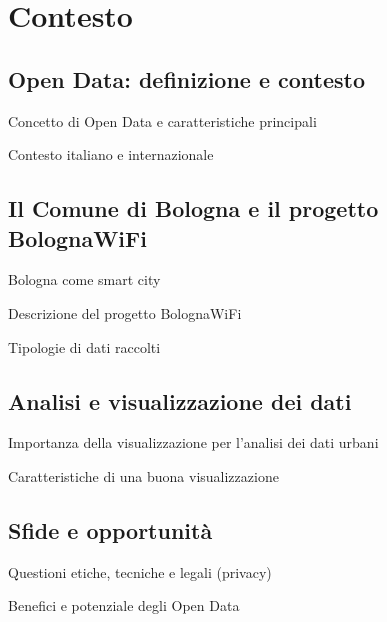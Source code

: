 \clearpage{\pagestyle{empty}\cleardoublepage}
\chapter{Contesto}
\lhead[\fancyplain{}{\bfseries\thepage}]{\fancyplain{}{\bfseries\rightmark}}


\section{Open Data: definizione e contesto}
Concetto di Open Data e caratteristiche principali

Contesto italiano e internazionale

\section{Il Comune di Bologna e il progetto BolognaWiFi}
Bologna come smart city

Descrizione del progetto BolognaWiFi

Tipologie di dati raccolti

\section{Analisi e visualizzazione dei dati}
Importanza della visualizzazione per l'analisi dei dati urbani

Caratteristiche di una buona visualizzazione

\section{Sfide e opportunità}
Questioni etiche, tecniche e legali (privacy)

Benefici e potenziale degli Open Data
